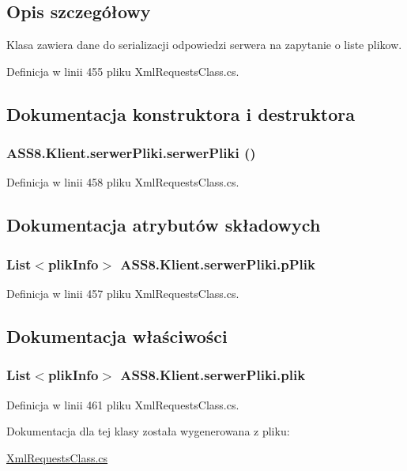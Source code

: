 \subsection{Opis szczegółowy}
Klasa zawiera dane do serializacji odpowiedzi serwera na zapytanie o liste plikow. 



Definicja w linii 455 pliku XmlRequestsClass.cs.

\subsection{Dokumentacja konstruktora i destruktora}
\hypertarget{a00026_cd11d0671b4895530877a83a471c81ae}{
\subsubsection[{serwerPliki}]{\setlength{\rightskip}{0pt plus 5cm}ASS8.Klient.serwerPliki.serwerPliki ()}}
\label{d6/d5b/a00026_cd11d0671b4895530877a83a471c81ae}




Definicja w linii 458 pliku XmlRequestsClass.cs.

\subsection{Dokumentacja atrybutów składowych}
\hypertarget{a00026_8d8e172bb33ce06a586d4790c33a41b4}{
\subsubsection[{pPlik}]{\setlength{\rightskip}{0pt plus 5cm}List$<${\bf plikInfo}$>$ {\bf ASS8.Klient.serwerPliki.pPlik}}}
\label{d6/d5b/a00026_8d8e172bb33ce06a586d4790c33a41b4}




Definicja w linii 457 pliku XmlRequestsClass.cs.

\subsection{Dokumentacja właściwości}
\hypertarget{a00026_b6d1b334712037271b25777240056f83}{
\subsubsection[{plik}]{\setlength{\rightskip}{0pt plus 5cm}List$<${\bf plikInfo}$>$ ASS8.Klient.serwerPliki.plik}}
\label{d6/d5b/a00026_b6d1b334712037271b25777240056f83}




Definicja w linii 461 pliku XmlRequestsClass.cs.

Dokumentacja dla tej klasy została wygenerowana z pliku:\begin{CompactItemize}
\item 
\hyperlink{a00055}{XmlRequestsClass.cs}\end{CompactItemize}
